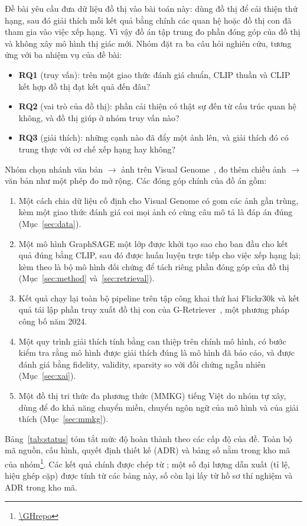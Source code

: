 Đề bài yêu cầu đưa dữ liệu đồ thị vào bài toán này: dùng đồ thị để cải thiện thứ hạng, sau đó giải thích mỗi kết quả bằng chính các quan hệ hoặc đồ thị con đã tham gia vào việc xếp hạng. Vì vậy đồ án tập trung đo phần đóng góp của đồ thị và không xây mô hình thị giác mới. Nhóm đặt ra ba câu hỏi nghiên cứu, tương ứng với ba nhiệm vụ của đề bài:
\begin{itemize}
\item \textbf{RQ1} (truy vấn): trên một giao thức đánh giá chuẩn, CLIP thuần và CLIP kết hợp đồ thị đạt kết quả đến đâu?
\item \textbf{RQ2} (vai trò của đồ thị): phần cải thiện có thật sự đến từ cấu trúc quan hệ không, và đồ thị giúp ở nhóm truy vấn nào?
\item \textbf{RQ3} (giải thích): những cạnh nào đã đẩy một ảnh lên, và giải thích đó có trung thực với cơ chế xếp hạng hay không?
\end{itemize}

Nhóm chọn nhánh văn bản $\to$ ảnh trên Visual Genome~\cite{krishna2017vg}, đo thêm chiều ảnh $\to$ văn bản như một phép đo mở rộng. Các đóng góp chính của đồ án gồm:
\begin{enumerate}
\item Một cách chia dữ liệu cố định cho Visual Genome có gom các ảnh gần trùng, kèm một giao thức đánh giá coi mọi ảnh có cùng câu mô tả là đáp án đúng (Mục~\ref{sec:data}).
\item Một mô hình GraphSAGE một lớp được khởi tạo sao cho ban đầu cho kết quả đúng bằng CLIP, sau đó được huấn luyện trực tiếp cho việc xếp hạng lại; kèm theo là bộ mô hình đối chứng để tách riêng phần đóng góp của đồ thị (Mục~\ref{sec:method} và~\ref{sec:retrieval}).
\item Kết quả chạy lại toàn bộ pipeline trên tập công khai thứ hai Flickr30k và kết quả tái lập phần truy xuất đồ thị con của G-Retriever~\cite{he2024gretriever}, một phương pháp công bố năm 2024.
\item Một quy trình giải thích tính bằng can thiệp trên chính mô hình, có bước kiểm tra rằng mô hình được giải thích đúng là mô hình đã báo cáo, và được đánh giá bằng fidelity, validity, sparsity so với đối chứng ngẫu nhiên (Mục~\ref{sec:xai}).
\item Một đồ thị tri thức đa phương thức (MMKG) tiếng Việt do nhóm tự xây, dùng để đo khả năng chuyển miền, chuyển ngôn ngữ của mô hình và của giải thích (Mục~\ref{sec:mmkg}).
\end{enumerate}

Bảng~\ref{tab:status} tóm tắt mức độ hoàn thành theo các cấp độ của đề. Toàn bộ mã nguồn, cấu hình, quyết định thiết kế (ADR) và bảng số nằm trong kho mã của nhóm\footnote{\url{\GHrepo}}. Các kết quả chính được chép từ ; một số đại lượng dẫn xuất (tỉ lệ, hiệu ghép cặp) được tính từ các bảng này, số còn lại lấy từ hồ sơ thí nghiệm và ADR trong kho mã.

